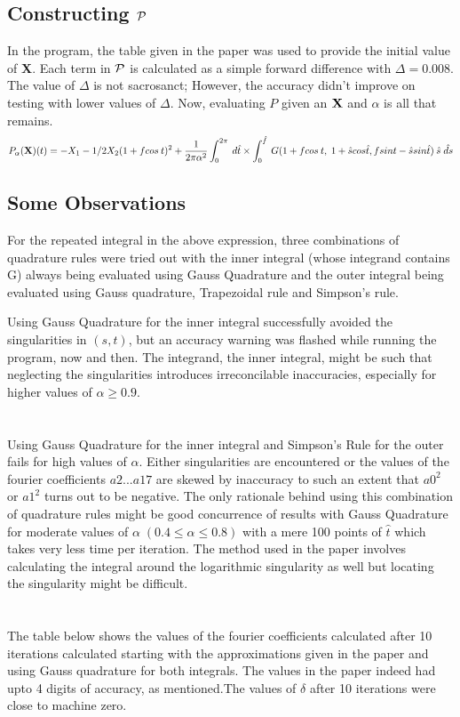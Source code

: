 \documentclass[10pt,a4paper,final]{report}
\begin{document}
\subsection{Constructing ${\cal P}$}
%
In the program, the table given in the paper\cite{norbury} was used to provide the initial value of {\bf X}.
Each term in ${\cal P}$ is calculated as a simple forward difference with $\Delta = 0.008$. The value of $\Delta$ is not sacrosanct; However, the accuracy didn't improve on testing with lower values of $\Delta$. 
Now, evaluating $P$ given an $\bf X$ and $\alpha$ is all that remains. 
\begin{equation}
P_\alpha({\bf X})(t) = -X_1 - 1/2 X_2 (1 + fcos\: t)^2 + 
\frac{1}{2\pi\alpha^2} \int_0^{2\pi} \: d\hat{t} \times 
\int_0^{\hat{f}} \: G(1+fcos\: t,       
\; 1 + \hat{s}cos {\hat{t}} , f sin t - 
\hat{s}sin \hat{t}) \: \hat{s} \; \hat{ds}
%
\end{equation}

\subsection{Some Observations}
For the repeated integral in the above expression, three combinations of quadrature rules were tried out with the inner integral (whose integrand contains G) always being evaluated using Gauss Quadrature and the outer integral being evaluated using Gauss quadrature, Trapezoidal rule and Simpson's rule. 

 Using Gauss Quadrature for the inner integral successfully avoided the singularities in $(s,t)$, but an accuracy warning was flashed while running the program, now and then. The integrand, the inner integral, might be such that neglecting the singularities introduces irreconcilable inaccuracies, especially for higher values of $\alpha \geq 0.9$\cite{singularity}. 
\\
\\
\\
Using Gauss Quadrature for the inner integral and Simpson's Rule for the outer fails for high values of $\alpha$. Either singularities are encountered or the values of the fourier coefficients $a2...a17$ are skewed by inaccuracy to such an extent that $a0^2$ or $a1^2$ turns out to be negative. The only rationale behind using this combination of quadrature rules might be good concurrence of results with Gauss Quadrature for moderate values of $\alpha \; (0.4\leq\alpha\leq0.8) $ with a mere 100 points of $\hat{t}$ which takes very less time per iteration.   
The method used in the paper involves calculating the integral around the logarithmic singularity as well but locating the singularity might be difficult. 
\\
\\
\\
The table below shows the values of the fourier coefficients calculated after 10 iterations calculated starting with the approximations given in the paper and using Gauss quadrature for both integrals. The values in the paper\cite{norbury} indeed had upto 4 digits of accuracy, as mentioned.The values of $\delta$ after 10 iterations were close to machine zero. 
  
\end{document}
